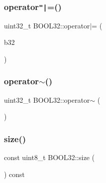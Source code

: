 \hypertarget{struct_b_o_o_l32_a54d0ae603440f3143c44021b285b730c}{}\label{struct_b_o_o_l32_a54d0ae603440f3143c44021b285b730c} 
\subsubsection{\texorpdfstring{operator\texttt{"|}=()}{operator|=()}\hspace{0.1cm}{\footnotesize\ttfamily [2/2]}}
{\footnotesize\ttfamily uint32\+\_\+t B\+O\+O\+L32\+::operator$\vert$= (\begin{DoxyParamCaption}\item[{const \hyperlink{struct_b_o_o_l32}{B\+O\+O\+L32}}]{b32 }\end{DoxyParamCaption})\hspace{0.3cm}{\ttfamily [inline]}}

\hypertarget{struct_b_o_o_l32_a4631d6c135bd999da74d05c6892fe2b3}{}\label{struct_b_o_o_l32_a4631d6c135bd999da74d05c6892fe2b3} 
\subsubsection{\texorpdfstring{operator$\sim$()}{operator~()}}
{\footnotesize\ttfamily uint32\+\_\+t B\+O\+O\+L32\+::operator$\sim$ (\begin{DoxyParamCaption}\item[{void}]{ }\end{DoxyParamCaption})\hspace{0.3cm}{\ttfamily [inline]}}

\hypertarget{struct_b_o_o_l32_a675a7e950b6326141f343c88813137e9}{}\label{struct_b_o_o_l32_a675a7e950b6326141f343c88813137e9} 
\subsubsection{\texorpdfstring{size()}{size()}}
{\footnotesize\ttfamily const uint8\+\_\+t B\+O\+O\+L32\+::size (\begin{DoxyParamCaption}{ }\end{DoxyParamCaption}) const\hspace{0.3cm}{\ttfamily [inline]}}



